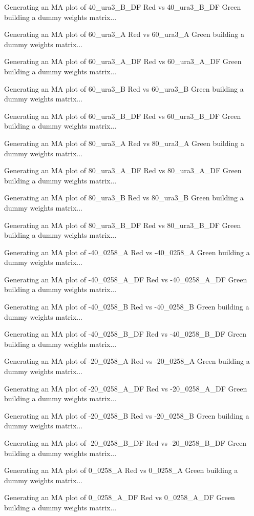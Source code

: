 \documentclass[titlepage]{article}
\begin{document}
\begin{Schunk}
\begin{Soutput}
Generating an MA plot of  40_ura3_B_DF Red vs 40_ura3_B_DF Green 
building a dummy weights matrix... 

Generating an MA plot of  60_ura3_A Red vs 60_ura3_A Green 
building a dummy weights matrix... 

Generating an MA plot of  60_ura3_A_DF Red vs 60_ura3_A_DF Green 
building a dummy weights matrix... 

Generating an MA plot of  60_ura3_B Red vs 60_ura3_B Green 
building a dummy weights matrix... 

Generating an MA plot of  60_ura3_B_DF Red vs 60_ura3_B_DF Green 
building a dummy weights matrix... 

Generating an MA plot of  80_ura3_A Red vs 80_ura3_A Green 
building a dummy weights matrix... 

Generating an MA plot of  80_ura3_A_DF Red vs 80_ura3_A_DF Green 
building a dummy weights matrix... 

Generating an MA plot of  80_ura3_B Red vs 80_ura3_B Green 
building a dummy weights matrix... 

Generating an MA plot of  80_ura3_B_DF Red vs 80_ura3_B_DF Green 
building a dummy weights matrix... 

Generating an MA plot of  -40_0258_A Red vs -40_0258_A Green 
building a dummy weights matrix... 

Generating an MA plot of  -40_0258_A_DF Red vs -40_0258_A_DF Green 
building a dummy weights matrix... 

Generating an MA plot of  -40_0258_B Red vs -40_0258_B Green 
building a dummy weights matrix... 

Generating an MA plot of  -40_0258_B_DF Red vs -40_0258_B_DF Green 
building a dummy weights matrix... 

Generating an MA plot of  -20_0258_A Red vs -20_0258_A Green 
building a dummy weights matrix... 

Generating an MA plot of  -20_0258_A_DF Red vs -20_0258_A_DF Green 
building a dummy weights matrix... 

Generating an MA plot of  -20_0258_B Red vs -20_0258_B Green 
building a dummy weights matrix... 

Generating an MA plot of  -20_0258_B_DF Red vs -20_0258_B_DF Green 
building a dummy weights matrix... 

Generating an MA plot of  0_0258_A Red vs 0_0258_A Green 
building a dummy weights matrix... 

Generating an MA plot of  0_0258_A_DF Red vs 0_0258_A_DF Green 
building a dummy weights matrix... 


\end{Soutput}
\end{Schunk}
\end{document}
